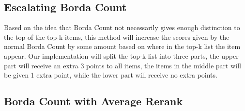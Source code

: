 \subsection{Escalating Borda Count}
Based on the idea that Borda Count not necessarily gives enough distinction to the top of the top-k items, this method will increase the scores given by the normal Borda Count by some amount based on where in the top-k list the item appear. Our implementation will split the top-k list into three parts, the upper part will receive an extra 3 points to all items, the items in the middle part will be given 1 extra point, while the lower part will receive no extra points.




\subsection{Borda Count with Average Rerank}
